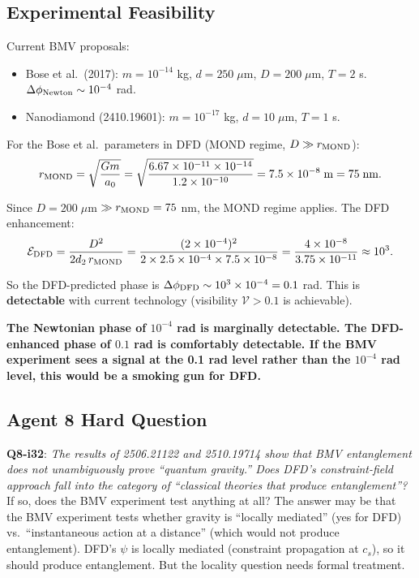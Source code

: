 \documentclass[11pt,a4paper]{article}
\begin{document}
\subsection{Experimental Feasibility}
\label{sec:BMV-feasibility}

Current BMV proposals:
\begin{itemize}
\item Bose et al.\ (2017): $m = 10^{-14}$ kg, $d = 250\;\mu$m, $D = 200\;\mu$m, $T = 2$ s. $\Delta\phi_{\rm Newton} \sim 10^{-4}$ rad.
\item Nanodiamond (2410.19601): $m = 10^{-17}$ kg, $d = 10\;\mu$m, $T = 1$ s.
\end{itemize}

For the Bose et al.\ parameters in DFD (MOND regime, $D \gg r_{\rm MOND}$):
\begin{equation}
r_{\rm MOND} = \sqrt{\frac{Gm}{a_0}} = \sqrt{\frac{6.67\times 10^{-11}\times 10^{-14}}{1.2\times 10^{-10}}} = 7.5\times 10^{-8}\;\text{m} = 75\;\text{nm}.
\end{equation}

Since $D = 200\;\mu$m $\gg r_{\rm MOND} = 75$ nm, the MOND regime applies. The DFD enhancement:
\begin{equation}
\mathcal{E}_{\rm DFD} = \frac{D^2}{2d_2\,r_{\rm MOND}}
= \frac{(2\times 10^{-4})^2}{2\times 2.5\times 10^{-4}\times 7.5\times 10^{-8}}
= \frac{4\times 10^{-8}}{3.75\times 10^{-11}} \approx 10^3.
\end{equation}

So the DFD-predicted phase is $\Delta\phi_{\rm DFD} \sim 10^3 \times 10^{-4} = 0.1$ rad. This is \textbf{detectable} with current technology (visibility $\mathcal{V} > 0.1$ is achievable).

\textbf{The Newtonian phase of $10^{-4}$ rad is marginally detectable. The DFD-enhanced phase of $0.1$ rad is comfortably detectable. If the BMV experiment sees a signal at the 0.1 rad level rather than the $10^{-4}$ rad level, this would be a smoking gun for DFD.}

\subsection{Agent 8 Hard Question}

\textbf{Q8-i32}: \emph{The results of 2506.21122 and 2510.19714 show that BMV entanglement does not unambiguously prove ``quantum gravity.'' Does DFD's constraint-field approach fall into the category of ``classical theories that produce entanglement''?} If so, does the BMV experiment test anything at all? The answer may be that the BMV experiment tests whether gravity is ``locally mediated'' (yes for DFD) vs.\ ``instantaneous action at a distance'' (which would not produce entanglement). DFD's $\psi$ is locally mediated (constraint propagation at $c_s$), so it should produce entanglement. But the locality question needs formal treatment.
\end{document}
